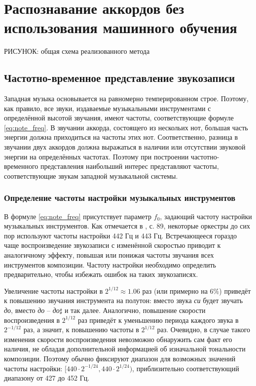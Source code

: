 \chapter{Распознавание аккордов без использования машинного обучения}
\label{chapt1}

РИСУНОК: общая схема реализованного метода

\section{Частотно-временное представление звукозаписи} \label{sect1_spectrogram}

Западная музыка основывается на равномерно темперированном строе. Поэтому, как
правило, все звуки, издаваемые музыкальными инструментами с определённой высотой
звучания, имеют частоты, соответствующие формуле \ref{eq:note_freq}. В звучании
аккорда, состоящего из нескольих нот, большая часть энергии должна приходиться
на частоты этих нот. Соответственно, разница в звучании двух аккордов должна
выражаться в наличии или отсутствии звуковой энергии на определённых частотах.
Поэтому при построении частотно-временного представления наибольший интерес
представляют частоты, соответствующие звукам западной музыкальной системы. 

\subsection{Определение частоты настройки музыкальных инструментов}
\label{ssect1_f0}

В формуле \ref{eq:note_freq} присутствует параметр $f_0$, задающий частоту
настройки музыкальных инструментов. Как отмечается в \cite{Lerch2012}, с. 89,
некоторые оркестры до сих пор используют частоты настройки 442 Гц и 443 Гц.
Встречающееся гораздо чаще воспроизведение звукозаписи с изменённой скоростью
приводит к аналогичному эффекту, повышая или понижая частоты звучания всех
инструментов композиции. Частоту настройки необходимо определить предварительно,
чтобы избежать ошибок на таких звукозаписях.

Увеличение частоты настройки в $2^{1/12} \approx 1.06$ раз (или примерно на 6\%)
приведёт к повышению звучания инструмента на полутон: вместо звука \emph{си}
будет звучать \emph{до}, вместо \emph{до} -- \emph{до}$\sharp$ и так далее.
Аналогично, повышение скорости воспроизведения в $2^{1/12}$ раз приведёт к
уменьшению периода каждого звука в $2^{-1/12}$ раз, а значит, к повышению
частоты в $2^{1/12}$ раз. Очевидно, в случае такого изменения скорости
воспроизведения невозможно обнаружить сам факт его наличия, не обладая
дополнительной информацией об изначальной тональности композиции. Поэтому обычно
фиксируют диапазон для возможных значений частоты настройки: $[440 \cdot
2^{-1/24}, 440 \cdot 2^{1/24})$, приблизительно соответствующий диапазону от 427
до 452 Гц.

